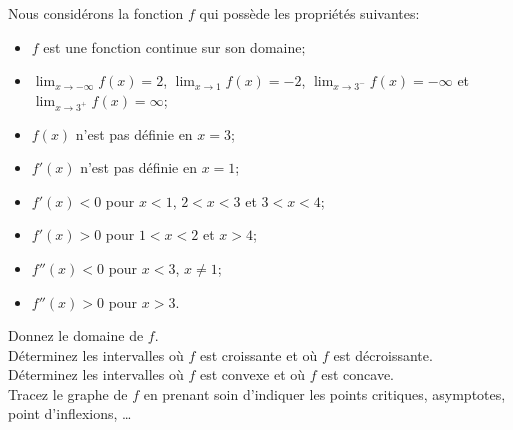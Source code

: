 \begin{question}[4 points]
Nous considérons la fonction $f$ qui possède les propriétés suivantes:
{\renewcommand{\labelitemi}{\textbullet}
\begin{itemize}
\item $f$ est une fonction continue sur son domaine;
\item $\displaystyle \lim_{x\to -\infty}f(x)=2$,
$\displaystyle \lim_{x\to 1}f(x)=-2$,
$\displaystyle \lim_{x\to 3^-} f(x) = -\infty$ et
$\displaystyle \lim_{x\to 3^+}f(x)= \infty$;
\item $f(x)$ n'est pas définie en $x=3$;
\item $f'(x)$ n'est pas définie en $x=1$;
\item $f'(x)<0$ pour $x<1$, $2 < x < 3$ et $3 < x < 4$;
\item $f'(x)>0$ pour $1 < x < 2$ et $x > 4$;
\item $f''(x)<0$ pour $x<3$, $x\neq 1$;
\item $f''(x)>0$ pour $x>3$.
\end{itemize}
}
 Donnez le domaine de $f$.\\
 Déterminez les intervalles où $f$ est croissante et où $f$
est décroissante.\\
 Déterminez les intervalles où $f$ est convexe et
où $f$ est concave.\\
 Tracez le graphe de $f$ en prenant soin d'indiquer les points
critiques, asymptotes, point d'inflexions, \ldots
\label{6Q20}
\end{question}

